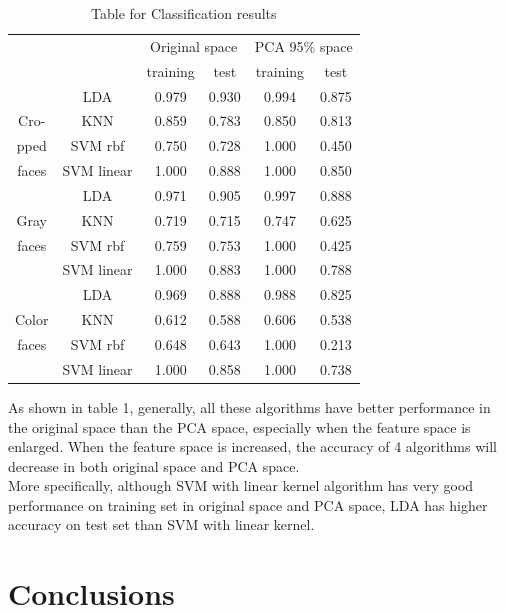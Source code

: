 \documentclass[11pt,letterpaper]{article}
\begin{document}
\begin{table}[H]
  {\centering
    \begin{tabular}{|c|c||c|c||c|c|}
      \hline 
& & \multicolumn{2}{c||}{Original space} & \multicolumn{2}{c|}{PCA 95\% space} \\
\cline{3-6}
& & training &
 test & training & test \\
\hline \hline
& LDA & 0.979 & 0.930 & 0.994 & 0.875 \\
\cline{2-6}
Cro- & KNN & 0.859 & 0.783 & 0.850 & 0.813 \\
\cline{2-6}
pped & SVM rbf & 0.750 & 0.728 & 1.000 & 0.450 \\
\cline{2-6}
faces & SVM linear & 1.000 & 0.888 & 1.000 & 0.850 \\
\hline \hline

& LDA & 0.971 & 0.905 & 0.997 & 0.888 \\
\cline{2-6}
Gray & KNN & 0.719 & 0.715 & 0.747 & 0.625 \\
\cline{2-6}
faces & SVM rbf & 0.759 & 0.753 & 1.000 & 0.425 \\
\cline{2-6}
& SVM linear & 1.000 & 0.883 & 1.000 & 0.788 \\
\hline \hline

& LDA & 0.969 & 0.888 & 0.988 & 0.825 \\
\cline{2-6}
Color & KNN & 0.612 & 0.588 & 0.606 & 0.538 \\
\cline{2-6}
faces & SVM rbf & 0.648 & 0.643 & 1.000 & 0.213 \\
\cline{2-6}
& SVM linear & 1.000 & 0.858 & 1.000 & 0.738 \\
\hline \hline

\end{tabular}
\caption{Table for Classification results} \label{table:ltu}}
\end{table}

As shown in table 1, generally, all these algorithms have better performance in the original space than the PCA space, especially when the feature space is enlarged. When the feature space is increased, the accuracy of 4 algorithms will decrease in both original space and PCA space. \\

More specifically, although SVM with linear kernel algorithm has very good performance on training set in original space and PCA space, LDA has higher accuracy on test set than SVM with linear kernel.\\

\section{Conclusions}
\end{document}
